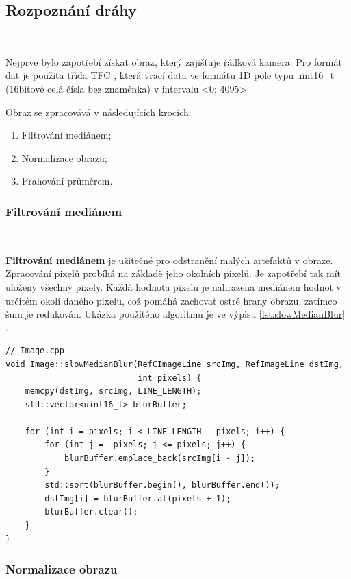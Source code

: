 \subsection{Rozpoznání dráhy}\

Nejprve bylo zapotřebí získat obraz, který zajišťuje řádková kamera. Pro formát dat
je použita třída TFC \cite{draha}, která vrací data ve formátu 1D pole typu uint16\_t
(16bitové celá čísla bez znaménka) v intervalu <0; 4095>.

Obraz se zpracovává v následujících krocích:
\begin{enumerate}
    \item Filtrování mediánem;
    \item Normalizace obrazu;
    \item Prahování průměrem.
\end{enumerate}

\subsubsection*{Filtrování mediánem}\

\textbf{Filtrování mediánem} je užitečné pro odstranění malých artefaktů v obraze.
Zpracování pixelů probíhá na základě jeho okolních pixelů. Je zapotřebí tak mít
uloženy všechny pixely. Každá hodnota pixelu je nahrazena mediánem hodnot v určitém
okolí daného pixelu, což pomáhá zachovat ostré hrany obrazu, zatímco šum je
redukován. Ukázka použitého algoritmu je ve výpisu \ref{lst:slowMedianBlur} \cite{draha}\cite{robot}.

\begin{lstlisting}[caption = Filtrování mediánem, label = lst:slowMedianBlur]
// Image.cpp
void Image::slowMedianBlur(RefCImageLine srcImg, RefImageLine dstImg,
                           int pixels) {
    memcpy(dstImg, srcImg, LINE_LENGTH);
    std::vector<uint16_t> blurBuffer;

    for (int i = pixels; i < LINE_LENGTH - pixels; i++) {
        for (int j = -pixels; j <= pixels; j++) {
            blurBuffer.emplace_back(srcImg[i - j]);
        }
        std::sort(blurBuffer.begin(), blurBuffer.end());
        dstImg[i] = blurBuffer.at(pixels + 1);
        blurBuffer.clear();
    }
}
\end{lstlisting}


\subsubsection*{Normalizace obrazu}\

